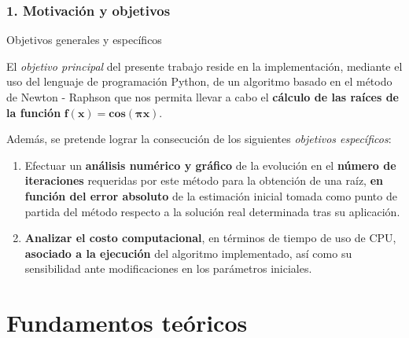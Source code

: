 \documentclass{beamer}
\begin{document}
\begin{frame}

\frametitle{1. Motivación y objetivos}
\begin{block}{Objetivos generales y específicos} 

El \emph{objetivo principal} del presente trabajo reside en la implementación, mediante
el uso del lenguaje de programación Python, de un algoritmo basado en el método de 
Newton - Raphson que nos permita llevar a cabo el \textbf{cálculo de las raíces de la 
función} $\boldsymbol{f(x) = cos(\pi x)}$. \pause

Además, se pretende lograr la consecución de los siguientes \emph{objetivos específicos}:

    \begin{enumerate}
      \item
        Efectuar un \textbf{análisis numérico y gráfico} de la evolución en el \textbf{número 
        de iteraciones} requeridas por este método para la obtención de una raíz, \textbf{en 
        función del error absoluto} de la estimación inicial tomada como punto de partida del 
        método respecto a la solución real determinada tras su aplicación.
        \pause
      \item
         \textbf{Analizar el costo computacional}, en términos de tiempo de uso de CPU, 
         \textbf{asociado a la ejecución} del algoritmo implementado, así como su 
         sensibilidad ante modificaciones en los parámetros iniciales.
    \end{enumerate}

\end{block}
\end{frame}


\section{Fundamentos teóricos}

\end{document}
